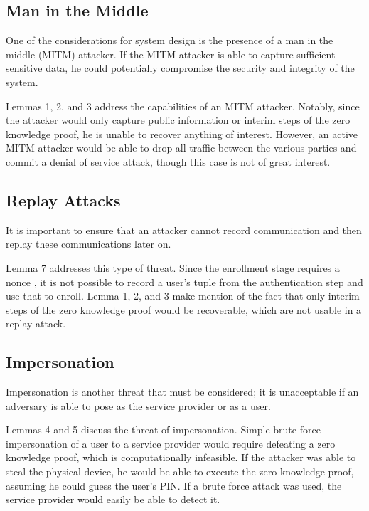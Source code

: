 \subsection{Man in the Middle}
One of the considerations for system design is the presence of a man in the middle (MITM) attacker. If the MITM
attacker is able to capture sufficient sensitive data, he could potentially compromise the security and integrity
of the system. 

Lemmas 1, 2, and 3 address the capabilities of an MITM attacker. Notably, since the attacker would only capture
public information or interim steps of the zero knowledge proof, he is unable to recover anything of interest.
However, an active MITM attacker would be able to drop all traffic between the various parties and commit a
denial of service attack, though this case is not of great interest.

\subsection{Replay Attacks}
It is important to ensure that an attacker cannot record communication and then replay these communications
later on.

Lemma 7 addresses this type of threat. Since the enrollment stage requires a nonce , it is not possible
to record a user's tuple from the authentication step and use that to enroll. Lemma 1, 2, and 3 make mention
of the fact that only interim steps of the zero knowledge proof would be recoverable, which are not usable
in a replay attack.

\subsection{Impersonation}
Impersonation is another threat that must be considered; it is unacceptable if an adversary is able to pose as
the service provider or as a user.

Lemmas 4 and 5 discuss the threat of impersonation. Simple brute force impersonation of a user to a service
provider would require defeating a zero knowledge proof, which is computationally infeasible. If the attacker
was able to steal the physical device, he would be able to execute the zero knowledge proof, assuming he could
guess the user's PIN. If a brute force attack was used, the service provider would easily be able to detect it.

